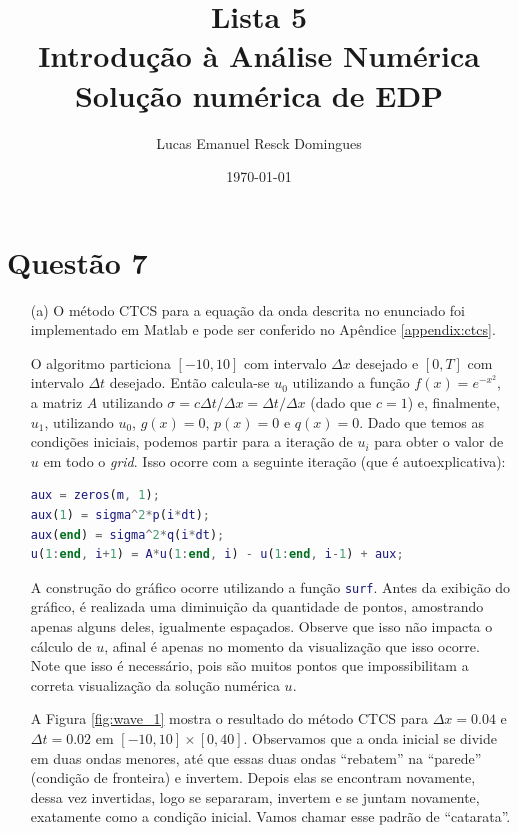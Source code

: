 \documentclass{article}
\title{Lista 5 \\
\large Introdução à Análise Numérica \\
Solução numérica de EDP}
\author{Lucas Emanuel Resck Domingues}
\date{\today}
\begin{document}
    \maketitle

    \section*{Questão 7}

    \begin{enumerate}
        \item[(a)] O método CTCS para a equação da onda
            descrita no enunciado foi implementado em Matlab e pode
            ser conferido no Apêndice \ref{appendix:ctcs}.

            O algoritmo particiona $[-10, 10]$ com intervalo
            $\Delta x$ desejado e $[0, T]$ com intervalo
            $\Delta t$ desejado. Então calcula-se $u_0$ utilizando a função
            $f(x) = e^{-x^2}$, a matriz $A$ utilizando
            $\sigma = c \Delta t / \Delta x = \Delta t / \Delta x$
            (dado que $c = 1$) e,
            finalmente, $u_1$, utilizando $u_0$, $g(x) = 0$, $p(x) = 0$
            e $q(x) = 0$. Dado que temos as condições iniciais,
            podemos partir para a iteração de $u_i$ para obter
            o valor de $u$ em todo o \textit{grid}. Isso ocorre com
            a seguinte iteração (que é autoexplicativa):

            \begin{lstlisting}[language=Matlab]
aux = zeros(m, 1);
aux(1) = sigma^2*p(i*dt);
aux(end) = sigma^2*q(i*dt);
u(1:end, i+1) = A*u(1:end, i) - u(1:end, i-1) + aux;
            \end{lstlisting}

            A construção do gráfico ocorre utilizando a função
            \lstinline[language=Matlab]{surf}. Antes da exibição do gráfico,
            é realizada uma diminuição da quantidade de pontos, amostrando
            apenas alguns deles, igualmente espaçados. Observe que isso
            não impacta o cálculo de $u$, afinal é apenas no momento da
            visualização que isso ocorre. Note que isso é necessário,
            pois são muitos pontos que impossibilitam a correta visualização
            da solução numérica $u$.

            A Figura \ref{fig:wave_1} mostra o resultado do método CTCS
            para $\Delta x = 0.04$ e $\Delta t = 0.02$ em
            $[-10, 10] \times [0, 40]$. Observamos que a onda inicial se divide
            em duas ondas menores, até que essas duas ondas ``rebatem'' na ``parede''
            (condição de fronteira) e invertem. Depois elas se encontram novamente,
            dessa vez invertidas, logo
            se separaram, invertem e se juntam novamente, exatamente como a condição
            inicial. Vamos chamar esse padrão de ``catarata''.


\end{enumerate}
\end{document}
